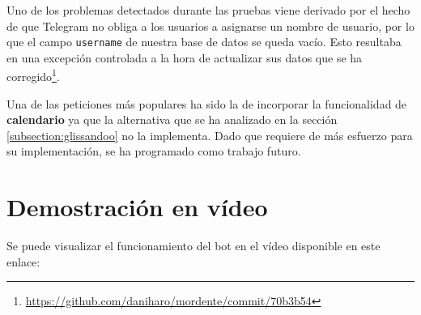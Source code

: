 Uno de los problemas detectados durante las pruebas viene derivado por el hecho de que Telegram no obliga a los usuarios a asignarse un nombre de usuario, por lo que el campo \texttt{username} de nuestra base de datos se queda vacío. Esto resultaba en una excepción controlada a la hora de actualizar sus datos que se ha corregido\footnote{\url{https://github.com/daniharo/mordente/commit/70b3b54}}.

Una de las peticiones más populares ha sido la de incorporar la funcionalidad de \textbf{calendario} ya que la alternativa que se ha analizado en la sección \ref{subsection:glissandoo} no la implementa. Dado que requiere de más esfuerzo para su implementación, se ha programado como trabajo futuro.


\section{Demostración en vídeo}

Se puede visualizar el funcionamiento del bot en el vídeo disponible en este enlace:
\url{}

